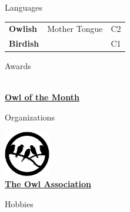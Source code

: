 \documentclass[withoutsidebar]{stylishcv} %
\begin{document}
	\begin{minipage}[t]{0.3\textwidth}
			\begin{darkshadedcvbox}Languages\end{darkshadedcvbox}
			\begin{tabular}{l l R{0.75cm}}
				\textbf{Owlish}  & {\phantom{x}\footnotesize Mother Tongue} &\hspace{-0.1cm} C2\\
				\textbf{Birdish} &   & \hspace{-0.1cm}C1\\
			\end{tabular}
			\smallskip
		\end{minipage}\hfill
		\begin{minipage}[t]{0.15\textwidth}
			\begin{darkshadedcvbox}Awards\end{darkshadedcvbox}
			{\footnotesize
			\begin{center}
				\href{}{\Huge {\color{headercolour}\faInstitution}}\\[\baselineskip]\href{https://google.com}{\bfseries Owl of the Month}
			\end{center}}
			\smallskip
		\end{minipage}\hfill
		\begin{minipage}[t]{0.15\textwidth}
			\begin{darkshadedcvbox}Organizations\end{darkshadedcvbox}
			{\footnotesize
			\begin{center}
				\href{}{\includegraphics[width=2cm]{resources/bird-badge.png}}\\[\baselineskip]	\href{https://google.com}{\bfseries The Owl Association}
			\end{center}}
			\smallskip
		\end{minipage}\hfill
		\begin{minipage}[t]{0.2\textwidth}
			\begin{darkshadedcvbox}Hobbies\end{darkshadedcvbox}
			\begin{center}
				\\
			\end{center}
		\end{minipage}
	\bigskip
		
\end{document}
